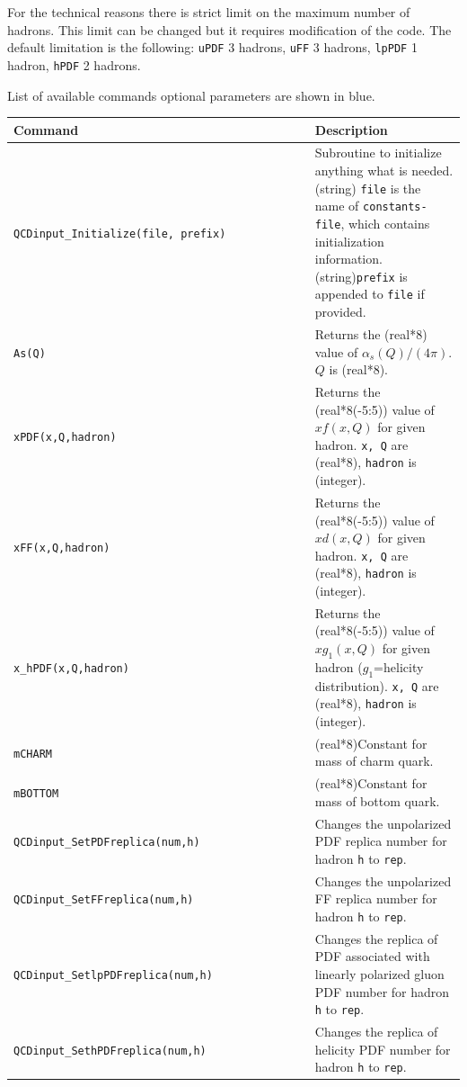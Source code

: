 \documentclass[prd,nofootinbib,eqsecnum,final]{revtex4}
\renewcommand{\(}{\left(}
\renewcommand{\)}{\right)}
\renewcommand{\[}{\left[}
\renewcommand{\]}{\right]}
\newcommand{\blue}[1]{{\color{blue} #1}}
\begin{document}
For the technical reasons there is strict limit on the maximum number of hadrons. This limit can be changed but it requires modification of the code. The default limitation is the following: \texttt{uPDF} 3 hadrons, \texttt{uFF} 3 hadrons, \texttt{lpPDF} 1 hadron, \texttt{hPDF} 2 hadrons.

\begin{center}
List of available commands \blue{optional parameters are shown in blue.}
\\
\begin{tabular}{||l|p{10cm}||}
\hline\hline
Command~~~~~~~~~~~~~~~~~~~~~~~~~~~~~~~ & Description
\\\hline
\texttt{QCDinput{\_}Initialize(file,\blue{prefix})} & Subroutine to initialize anything what is needed. (string) \texttt{file} is the name of \texttt{constants-file}, which contains initialization information. (string)\texttt{prefix} is appended to \texttt{file} if provided.
\\\hline
\texttt{As(Q)} &  Returns the (real*8) value of $\alpha_s(Q)/(4\pi)$. $Q$ is (real*8).
\\\hline
\texttt{xPDF(x,Q,hadron)} &  Returns the (real*8(-5:5)) value of $xf(x,Q)$ for given hadron. \texttt{x, Q} are (real*8), \texttt{hadron} is (integer).
\\\hline
\texttt{xFF(x,Q,hadron)} &  Returns the (real*8(-5:5)) value of $xd(x,Q)$ for given hadron. \texttt{x, Q} are (real*8), \texttt{hadron} is (integer).
\\\hline
\texttt{x\_hPDF(x,Q,hadron)} &  Returns the (real*8(-5:5)) value of $xg_1(x,Q)$ for given hadron ($g_1$=helicity distribution). \texttt{x, Q} are (real*8), \texttt{hadron} is (integer).
\\\hline
\texttt{mCHARM} &  (real*8)Constant for mass of charm quark.
\\\hline
\texttt{mBOTTOM} &  (real*8)Constant for mass of bottom quark.
\\\hline\hline
\texttt{QCDinput\_SetPDFreplica(num,h)} & Changes the unpolarized PDF replica number for hadron \texttt{h} to \texttt{rep}.
\\\hline
\texttt{QCDinput\_SetFFreplica(num,h)} & Changes the unpolarized FF replica number for hadron \texttt{h} to \texttt{rep}.
\\\hline
\texttt{QCDinput\_SetlpPDFreplica(num,h)} & Changes the replica of PDF associated with linearly polarized gluon PDF number for hadron \texttt{h} to \texttt{rep}.
\\\hline
\texttt{QCDinput\_SethPDFreplica(num,h)} & Changes the replica of helicity PDF number for hadron \texttt{h} to \texttt{rep}.
\\\hline\hline
\end{tabular}
\end{center}
\end{document}
